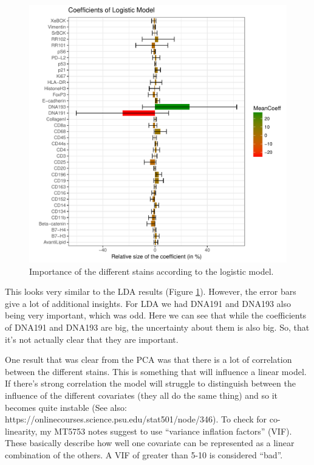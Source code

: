 \documentclass[a4paper]{article}\usepackage[]{graphicx}\usepackage[]{color}
\makeatletter
\def\maxwidth{ %
  \ifdim\Gin@nat@width>\linewidth
    \linewidth
  \else
    \Gin@nat@width
  \fi
}
\newenvironment{kframe}{%
 \def\at@end@of@kframe{}%
 \ifinner\ifhmode%
  \def\at@end@of@kframe{\end{minipage}}%
  \begin{minipage}{\columnwidth}%
 \fi\fi%
 \def\FrameCommand##1{\hskip\@totalleftmargin \hskip-\fboxsep
 \colorbox{shadecolor}{##1}\hskip-\fboxsep
     \hskip-\linewidth \hskip-\@totalleftmargin \hskip\columnwidth}%
 \MakeFramed {\advance\hsize-\width
   \@totalleftmargin\z@ \linewidth\hsize
   \@setminipage}}%
 {\par\unskip\endMakeFramed%
 \at@end@of@kframe}
\newenvironment{knitrout}{}{} %
\makeatother
\begin{document}
\begin{knitrout}
\begin{kframe}
\begin{alltt}
\end{alltt}
\end{kframe}\begin{figure}[t]
\includegraphics[width=\maxwidth]{figure/Fig_fullLogCoeff-1} \caption[Importance of the different stains according to the logistic model]{Importance of the different stains according to the logistic model.}\label{fig:Fig_fullLogCoeff}
\end{figure}


\end{knitrout}

This looks very similar to the LDA results (Figure \ref{fig:Fig_fullLogCoeff}). However, the error bars give a lot of additional insights. For LDA we had DNA191 and DNA193 also being very important, which was odd. Here we can see that while the coefficients of DNA191 and DNA193 are big, the uncertainty about them is also big. So, that it's not actually clear that they are important.

One result that was clear from the PCA was that there is a lot of correlation between the different stains. This is something that will influence a linear model. If there's strong correlation the model will struggle to distinguish between the influence of the different covariates (they all do the same thing) and so it becomes quite instable (See also: https://onlinecourses.science.psu.edu/stat501/node/346). To check for co-linearity, my MT5753 notes suggest to use ``variance inflation factors'' (VIF). These basically describe how well one covariate can be represented as a linear combination of the others. A VIF of greater than 5-10 is considered ``bad''.
\end{document}
